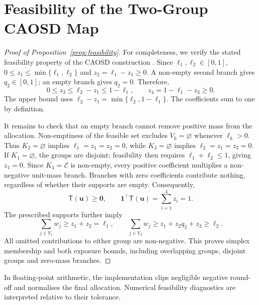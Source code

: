 \documentclass[10pt]{article}
\begin{document}
\appendix

\section{Feasibility of the Two-Group CAOSD Map}
\label{app:feasibility}

\begin{proof}[Proof of Proposition~\ref{prop:feasibility}]
For completeness, we verify the stated feasibility property of the CAOSD construction \citep{winkel2023}. Since $\ell_1,\ell_2\in[0,1]$,
$0\leq z_1\leq\min\{\ell_1,\ell_2\}$ and $z_2=\ell_1-z_1\geq0$.
A non-empty second branch gives $q_2\in[0,1]$; an empty branch gives $q_2=0$. Therefore,
\begin{equation}
  0\leq z_3
     \leq\ell_2-z_1
     \leq1-\ell_1,\qquad
  z_4=1-\ell_1-z_3\geq0.
  \label{eq:proof-mass-bound}
\end{equation}
The upper bound uses
$\ell_2-z_1=\min\{\ell_2,1-\ell_1\}$.
The coefficients sum to one by definition.

It remains to check that an empty branch cannot remove positive mass from the allocation. Non-emptiness of the feasible set excludes $V_k=\varnothing$ whenever $\ell_k>0$. Thus $K_2=\varnothing$ implies $\ell_1=z_1=z_2=0$, while $K_3=\varnothing$ implies $\ell_2=z_1=z_3=0$. If $K_1=\varnothing$, the groups are disjoint; feasibility then requires $\ell_1+\ell_2\leq1$, giving $z_1=0$. Since $K_4=\mathcal E$ is non-empty, every positive coefficient multiplies a non-negative unit-mass branch. Branches with zero coefficients contribute nothing, regardless of whether their supports are empty. Consequently,
\begin{equation}
  \mathsf T(\bm u)\geq\bm0,\qquad
  \mathbf1^\top\mathsf T(\bm u)=\sum_{i=1}^{4}z_i=1.
  \label{eq:proof-simplex}
\end{equation}
The prescribed supports further imply
\begin{equation}
  \sum_{j\in V_1}w_j\geq z_1+z_2=\ell_1,\qquad
  \sum_{j\in V_2}w_j\geq z_1+z_2q_2+z_3\geq\ell_2.
  \label{eq:proof-exposure}
\end{equation}
All omitted contributions to either group are non-negative. This proves simplex membership and both exposure bounds, including overlapping groups, disjoint groups and zero-mass branches.\end{proof}

In floating-point arithmetic, the implementation clips negligible negative round-off and normalises the final allocation. Numerical feasibility diagnostics are interpreted relative to their tolerance.
\end{document}
